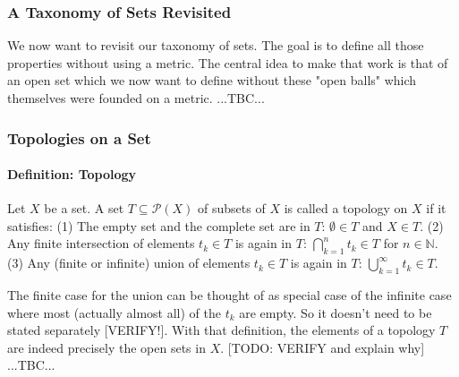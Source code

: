 \subsubsection{A Taxonomy of Sets Revisited}
We now want to revisit our taxonomy of sets. The goal is to define all those properties without using a metric. The central idea to make that work is that of an open set which we now want to define without these "open balls" which themselves were founded on a metric. ...TBC...







\subsubsection{Topologies on a Set}


\paragraph{Definition: Topology} 
Let $X$ be a set. A set $T \subseteq \mathcal{P}(X)$ of subsets of $X$ is called a topology on $X$ if it satisfies: (1) The empty set and the complete set are in $T$: $\emptyset \in T$ and $X \in T$. (2) Any finite intersection of elements $t_k \in T$ is again in $T$: $\bigcap_{k=1}^n t_k \in T$ for $n \in \mathbb{N}$. (3) Any (finite or infinite) union of elements $t_k \in T$ is again in $T$: $\bigcup_{k=1}^\infty t_k \in T$. 

\medskip
The finite case for the union can be thought of as special case of the infinite case where most (actually almost all) of the $t_k$ are empty. So it doesn't need to be stated separately [VERIFY!]. With that definition, the elements of a topology $T$ are indeed precisely the open sets in $X$. [TODO: VERIFY and explain why] ...TBC...

